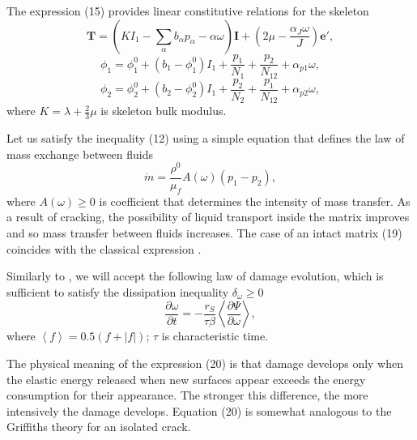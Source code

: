\documentclass[article,authoryear,jpm]{beg_39}             %
\begin{document}
The expression (15) provides linear constitutive relations for the skeleton
\begin{equation}
\mathbf{T}=\left( K{{I}_{1}}-\sum\limits_{\alpha }{{{b}_{\alpha }}{{p}_{\alpha }}-\alpha \omega } \right)\mathbf{I}+\left( 2\mu -\frac{{{\alpha }_{J}}\omega }{J} \right)\mathbf{{e}'},
\end{equation}
\begin{equation}
{{\phi }_{1}}=\phi _{1}^{0}+\left( {{b}_{1}}-\phi _{1}^{0} \right){{I}_{1}}+\frac{{{p}_{1}}}{{{N}_{1}}}+\frac{{{p}_{2}}}{{{N}_{12}}}+{{\alpha }_{p1}}\omega ,
\end{equation}
\begin{equation}
{{\phi }_{2}}=\phi _{2}^{0}+\left( {{b}_{2}}-\phi _{2}^{0} \right){{I}_{1}}+\frac{{{p}_{2}}}{{{N}_{2}}}+\frac{{{p}_{1}}}{{{N}_{12}}}+{{\alpha }_{p2}}\omega ,
\end{equation}
where $K=\lambda +\frac{2}{3}\mu$ is skeleton bulk modulus.

Let us satisfy the inequality (12) using a simple equation that defines the law of mass exchange between fluids
\begin{equation}
\dot{m}=\frac{\rho _{{}}^{0}}{{{\mu }_{f}}}A\left( \omega \right)\left( {{p}_{1}}-{{p}_{2}} \right),
\end{equation}
where $A\left( \omega \right)\ge 0$ is coefficient that determines the intensity of mass transfer.
As a result of cracking, the possibility of liquid transport inside the matrix improves and so mass transfer between fluids increases. The case of an intact matrix (19) coincides with the classical expression \cite{Barenblatt}.

Similarly to \cite{Kondaurov2002, Izvekov, Izvekov2020}, we will accept the following law of damage evolution, which is sufficient to satisfy the dissipation inequality ${{\delta }_{\omega }}\ge 0$
\begin{equation}
\frac{\partial \omega }{\partial t}=-\frac{{{r}_{S}}}{\tau \beta }\left\langle \frac{\partial \Psi }{\partial \omega }
 \right\rangle ,%
\end{equation}
where $\left\langle f \right\rangle =0.5(f+|f|)$; $\tau$ is characteristic time.

The physical meaning of the expression (20) is that damage develops only when the elastic energy released when new surfaces appear exceeds the energy consumption for their appearance. The stronger this difference, the more intensively the damage develops. Equation (20) is somewhat analogous to the Griffiths theory for an isolated crack.
\end{document}
